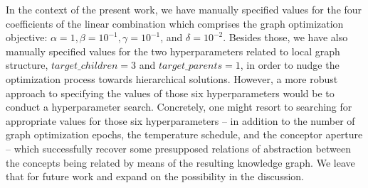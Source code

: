 In the context of the present work, we have manually specified values for the four coefficients of the linear combination which comprises the graph optimization objective: $\alpha=1, \beta=10^{-1}, \gamma=10^{-1}$, and $\delta=10^{-2}$. Besides those, we have also manually specified values for the two hyperparameters related to local graph structure, $target\_children=3$ and $target\_parents=1$, in order to nudge the optimization process towards hierarchical solutions. However, a more robust approach to specifying the values of those six hyperparameters would be to conduct a hyperparameter search. Concretely, one might resort to searching for appropriate values for those six hyperparameters -- in addition to the number of graph optimization epochs, the temperature schedule, and the conceptor aperture -- which successfully recover some presupposed relations of abstraction between the concepts being related by means of the resulting knowledge graph. We leave that for future work and expand on the possibility in the discussion.